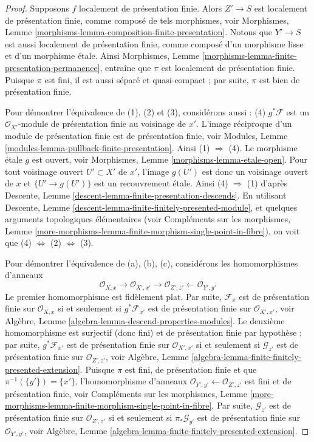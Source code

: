 \begin{proof}
Supposons $f$ localement de présentation finie. Alors $Z' \to S$ est localement
de présentation finie, comme composé de tels morphismes, voir
Morphismes, Lemme \ref{morphisms-lemma-composition-finite-presentation}.
Notons que $Y' \to S$ est aussi localement de présentation finie, comme composé
d'un morphisme lisse et d'un morphisme \'etale. Ainsi
Morphismes, Lemme \ref{morphisms-lemma-finite-presentation-permanence},
entraîne que $\pi$ est localement de présentation finie.
Puisque $\pi$ est fini, il est aussi séparé et
quasi-compact ; par suite, $\pi$ est bien de présentation finie.

\medskip\noindent
Pour démontrer l'équivalence de (1), (2) et (3), considérons aussi :
(4) $g^*\mathcal{F}$ est un $\mathcal{O}_{X'}$-module de présentation finie
au voisinage de $x'$. L'image réciproque d'un module de présentation finie
est de présentation finie, voir
Modules, Lemme \ref{modules-lemma-pullback-finite-presentation}.
Ainsi (1) $\Rightarrow$ (4).
Le morphisme \'etale $g$ est ouvert, voir
Morphismes, Lemme \ref{morphisms-lemma-etale-open}.
Pour tout voisinage ouvert $U' \subset X'$ de $x'$, l'image
$g(U')$ est donc un voisinage ouvert de $x$ et
$\{U' \to g(U')\}$ est un recouvrement \'etale. Ainsi (4) $\Rightarrow$ (1) d'après
Descente, Lemme \ref{descent-lemma-finite-presentation-descends}.
En utilisant
Descente, Lemme \ref{descent-lemma-finite-finitely-presented-module},
et quelques arguments topologiques élémentaires (voir
Compléments sur les morphismes,
Lemme \ref{more-morphisms-lemma-finite-morphism-single-point-in-fibre}),
on voit que
(4) $\Leftrightarrow$ (2) $\Leftrightarrow$ (3).

\medskip\noindent
Pour démontrer l'équivalence de (a), (b), (c), considérons les homomorphismes d'anneaux
$$
\mathcal{O}_{X, x} \to
\mathcal{O}_{X', x'} \to
\mathcal{O}_{Z', z'} \leftarrow
\mathcal{O}_{Y', y'}
$$
Le premier homomorphisme est fidèlement plat. Par suite,
$\mathcal{F}_x$ est de présentation finie sur $\mathcal{O}_{X, x}$
si et seulement si $g^*\mathcal{F}_{x'}$ est de présentation finie sur
$\mathcal{O}_{X', x'}$, voir
Algèbre, Lemme \ref{algebra-lemma-descend-properties-modules}.
Le deuxième homomorphisme est surjectif (donc fini) et
de présentation finie par hypothèse ; par suite,
$g^*\mathcal{F}_{x'}$ est de présentation finie sur $\mathcal{O}_{X', x'}$
si et seulement si $\mathcal{G}_{z'}$ est de présentation finie sur
$\mathcal{O}_{Z', z'}$, voir
Algèbre, Lemme \ref{algebra-lemma-finite-finitely-presented-extension}.
Puisque $\pi$ est fini, de présentation finie et que
$\pi^{-1}(\{y'\}) = \{x'\}$, l'homomorphisme d'anneaux
$\mathcal{O}_{Y', y'} \leftarrow \mathcal{O}_{Z', z'}$ est fini
et de présentation finie, voir
Compléments sur les morphismes,
Lemme \ref{more-morphisms-lemma-finite-morphism-single-point-in-fibre}.
Par suite, $\mathcal{G}_{z'}$ est de présentation finie sur $\mathcal{O}_{Z', z'}$
si et seulement si $\pi_*\mathcal{G}_{y'}$ est de présentation finie sur
$\mathcal{O}_{Y', y'}$, voir
Algèbre, Lemme \ref{algebra-lemma-finite-finitely-presented-extension}.
\end{proof}

